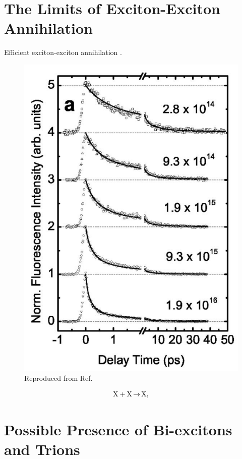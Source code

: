 \section{The Limits of Exciton-Exciton Annihilation}

Efficient exciton-exciton annihilation \cite{murakami2009existence}.

\begin{figure}[h]
	\centering
	\includegraphics[scale=0.4]{images/chapter_prior_works/pl_valkunas}
	\caption{Reproduced from Ref.\ \cite{valkunas2006exciton}}
\end{figure}

\begin{equation}
\label{eq:exc_annih}
\ce{X + X $\rightarrow$ X},
\end{equation}


\section{Possible Presence of Bi-excitons and Trions}

